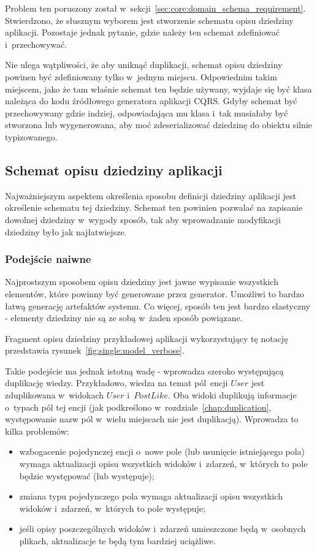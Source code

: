 Problem ten poruszony został w~sekcji~\ref{sec:core:domain_schema_requirement}.
Stwierdzono, że słusznym wyborem jest stworzenie schematu opisu dziedziny aplikacji.
Pozostaje jednak pytanie, gdzie należy ten schemat zdefiniować i~przechowywać.

Nie ulega wątpliwości, że aby uniknąć duplikacji, schemat opisu dziedziny powinen być zdefiniowany tylko w~jednym miejscu.
Odpowiednim takim miejscem, jako że tam właśnie schemat ten będzie używany, wyjdaje się być klasa należąca do kodu źródłowego generatora aplikacji CQRS.
Gdyby schemat być przechowywany gdzie indziej, odpowiadająca mu klasa i~tak musiałaby być stworzona lub wygenerowana, aby moć zdeserializować dziedzinę do obiektu silnie typizowanego.


\subsection{Schemat opisu dziedziny aplikacji}

Najważniejszym aspektem określenia sposobu definicji dziedziny aplikacji jest określenie schematu tej dziedziny.
Schemat ten powinien pozwalać na zapisanie dowolnej dziedziny w~wygody sposób, tak aby wprowadzanie modyfikacji dziedziny było jak najłatwiejsze.

\subsubsection{Podejście naiwne}

Najprostszym sposobem opisu dziedziny jest jawne wypisanie wszystkich elementów, które powinny być generowane przez generator.
Umożliwi to bardzo łatwą generację artefaktów systemu.
Co więcej, sposób ten jest bardzo elastyczny - elementy dziedziny nie są ze sobą w~żaden sposób powiązane.

Fragment opisu dziedziny przykładowej aplikacji wykorzystujący tę notację przedstawia rysunek~\ref{fig:single:model_verbose}.



Takie podejście ma jednak istotną wadę - wprowadza szeroko występującą duplikację wiedzy.
Przykładowo, wiedza na temat pól~encji $User$ jest zduplikowana w~widokach $User$ i~$PostLike$.
Oba widoki duplikują informacje o~typach pól tej encji (jak podkreślono w~rozdziale~\ref{chap:duplication}, występowanie nazw pól w~wielu miejscach nie jest duplikacją).
Wprowadza to kilka problemów:

\begin{itemize}
 \item wzbogacenie pojedynczej encji o~nowe pole (lub usunięcie istniejącego pola) wymaga aktualizacji opisu wszystkich widoków i~zdarzeń, w~których to pole będzie występować (lub występuje);
 \item zmiana typu pojedynczego pola wymaga aktualizacji opisu wszystkich widoków i~zdarzeń, w~których to pole występuje;
 \item jeśli opisy poszczególnych widoków i~zdarzeń umieszczone będą w~osobnych plikach, aktualizacje te będą tym bardziej uciążliwe.
\end{itemize}

